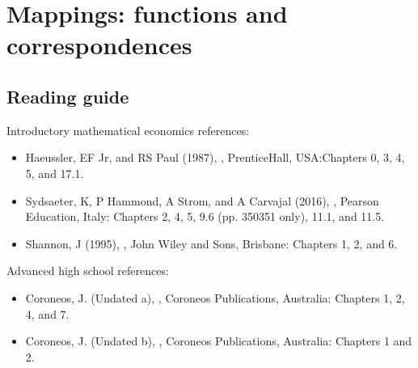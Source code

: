 \documentclass[letterpaper,10pt,english]{jupyterBook}
\begin{document}
\sphinxAtStartPar
{}

\sphinxstepscope


\chapter{Mappings: functions and correspondences}
\label{\detokenize{03.mappings_functions_correspondences:mappings-functions-and-correspondences}}\label{\detokenize{03.mappings_functions_correspondences::doc}}

\section{Reading guide}
\label{\detokenize{03.mappings_functions_correspondences:reading-guide}}
\sphinxAtStartPar
Introductory mathematical economics references:
\begin{itemize}
\item {} 
\sphinxAtStartPar
Haeussler, EF Jr, and RS Paul (1987), , Prentice\sphinxhyphen{}Hall, USA:Chapters 0, 3, 4, 5, and 17.1.

\item {} 
\sphinxAtStartPar
Sydsaeter, K, P Hammond, A Strom, and A Carvajal (2016), , Pearson Education, Italy: Chapters 2, 4, 5, 9.6 (pp. 350\sphinxhyphen{}351 only), 11.1, and 11.5.

\item {} 
\sphinxAtStartPar
Shannon, J (1995), , John Wiley and Sons, Brisbane: Chapters 1, 2, and 6.

\end{itemize}

\sphinxAtStartPar
Advanced high school references:
\begin{itemize}
\item {} 
\sphinxAtStartPar
Coroneos, J. (Undated a), , Coroneos Publications, Australia: Chapters 1, 2, 4, and 7.

\item {} 
\sphinxAtStartPar
Coroneos, J. (Undated b), , Coroneos Publications, Australia: Chapters 1 and 2.

\end{itemize}
\end{document}
